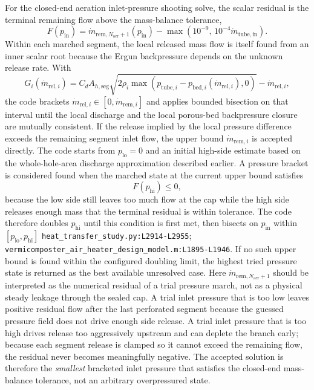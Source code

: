 \documentclass[11pt]{article}
\newcommand{\srcref}[1]{\nolinkurl{#1}}
\begin{document}
For the closed-end aeration inlet-pressure shooting solve, the scalar residual is the terminal remaining flow above the mass-balance tolerance,
\begin{equation}
\label{eq:closed_end_pressure_residual}
F\!\left(p_{\mathrm{in}}\right)=
\dot m_{\mathrm{rem},N_{\mathrm{aer}}+1}\!\left(p_{\mathrm{in}}\right)
-\max\!\left(10^{-9},\,10^{-4}\dot m_{\mathrm{tube,in}}\right).
\end{equation}
Within each marched segment, the local released mass flow is itself found from an inner scalar root because the Ergun backpressure depends on the unknown release rate. With
\[
G_i\!\left(\dot m_{\mathrm{rel},i}\right)=
C_d A_{h,\mathrm{seg}}
\sqrt{2\rho_i\max\!\left(p_{\mathrm{tube},i}-p_{\mathrm{bed},i}(\dot m_{\mathrm{rel},i}),0\right)}
-\dot m_{\mathrm{rel},i},
\]
the code brackets \(\dot m_{\mathrm{rel},i}\in[0,\dot m_{\mathrm{rem},i}]\) and applies bounded bisection on that interval until the local discharge and the local porous-bed backpressure closure are mutually consistent. If the release implied by the local pressure difference exceeds the remaining segment inlet flow, the upper bound \(\dot m_{\mathrm{rem},i}\) is accepted directly.
The code starts from \(p_{\mathrm{lo}}=0\) and an initial high-side estimate based on the whole-hole-area discharge approximation described earlier. A pressure bracket is considered found when the marched state at the current upper bound satisfies
\[
F\!\left(p_{\mathrm{hi}}\right)\le 0,
\]
because the low side still leaves too much flow at the cap while the high side releases enough mass that the terminal residual is within tolerance. The code therefore doubles \(p_{\mathrm{hi}}\) until this condition is first met, then bisects on \(p_{\mathrm{in}}\) within \([p_{\mathrm{lo}},p_{\mathrm{hi}}]\) \srcref{heat_transfer_study.py:L2914-L2955}; \srcref{vermicomposter_air_heater_design_model.m:L1895-L1946}. If no such upper bound is found within the configured doubling limit, the highest tried pressure state is returned as the best available unresolved case.
Here \(\dot m_{\mathrm{rem},N_{\mathrm{aer}}+1}\) should be interpreted as the numerical residual of a trial pressure march, not as a physical steady leakage through the sealed cap. A trial inlet pressure that is too low leaves positive residual flow after the last perforated segment because the guessed pressure field does not drive enough side release. A trial inlet pressure that is too high drives release too aggressively upstream and can deplete the branch early; because each segment release is clamped so it cannot exceed the remaining flow, the residual never becomes meaningfully negative. The accepted solution is therefore the \emph{smallest} bracketed inlet pressure that satisfies the closed-end mass-balance tolerance, not an arbitrary overpressured state.
\end{document}
